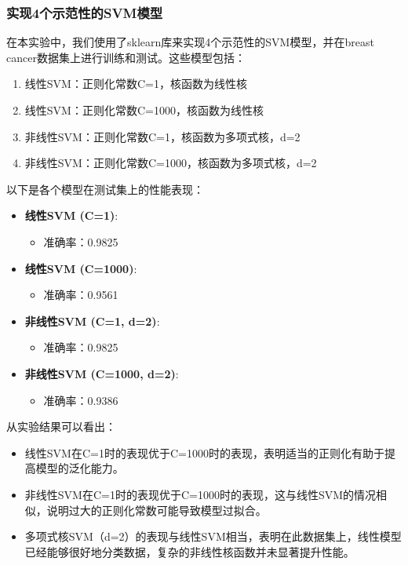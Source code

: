 \documentclass[12pt]{article}
\begin{document}
\subsubsection{实现4个示范性的SVM模型}

在本实验中，我们使用了sklearn库来实现4个示范性的SVM模型，并在breast cancer数据集上进行训练和测试。这些模型包括：

\begin{enumerate}
  \item 线性SVM：正则化常数C=1，核函数为线性核
  \item 线性SVM：正则化常数C=1000，核函数为线性核
  \item 非线性SVM：正则化常数C=1，核函数为多项式核，d=2
  \item 非线性SVM：正则化常数C=1000，核函数为多项式核，d=2
\end{enumerate}

以下是各个模型在测试集上的性能表现：

\begin{itemize}
  \item \textbf{线性SVM (C=1)}:
        \begin{itemize}
          \item 准确率：0.9825
        \end{itemize}

  \item \textbf{线性SVM (C=1000)}:
        \begin{itemize}
          \item 准确率：0.9561
        \end{itemize}

  \item \textbf{非线性SVM (C=1, d=2)}:
        \begin{itemize}
          \item 准确率：0.9825
        \end{itemize}

  \item \textbf{非线性SVM (C=1000, d=2)}:
        \begin{itemize}
          \item 准确率：0.9386
        \end{itemize}
\end{itemize}

从实验结果可以看出：
\begin{itemize}
  \item 线性SVM在C=1时的表现优于C=1000时的表现，表明适当的正则化有助于提高模型的泛化能力。
  \item 非线性SVM在C=1时的表现优于C=1000时的表现，这与线性SVM的情况相似，说明过大的正则化常数可能导致模型过拟合。
  \item 多项式核SVM（d=2）的表现与线性SVM相当，表明在此数据集上，线性模型已经能够很好地分类数据，复杂的非线性核函数并未显著提升性能。
\end{itemize}
\end{document}
